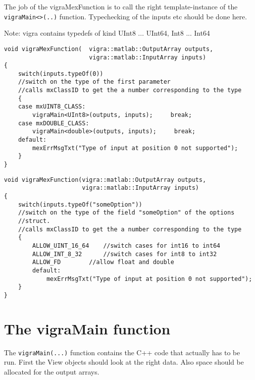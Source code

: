 \documentclass[a4paper,10pt]{article}
\begin{document}
The job of the vigraMexFunction is to call the right template-instance of the \verb+vigraMain<>(..)+ function. 
Typechecking of the inputs etc should be done here.


	
	Note: vigra contains typedefs of kind UInt8 ... UInt64, Int8 ... Int64
\begin{lstlisting}[caption={The first parameter of the Function can be of type double or of type UInt8  }]
void vigraMexFunction(	vigra::matlab::OutputArray outputs, 
                        vigra::matlab::InputArray inputs)
{
	switch(inputs.typeOf(0)) 
	//switch on the type of the first parameter
	//calls mxClassID to get the a number corresponding to the type
	{
	case mxUINT8_CLASS:
		vigraMain<UInt8>(outputs, inputs);     break;
	case mxDOUBLE_CLASS:
		vigraMain<double>(outputs, inputs);     break;
	default:
		mexErrMsgTxt("Type of input at position 0 not supported");
	}
}
\end{lstlisting}
\begin{lstlisting}[caption={Using Macros - This only works if vigraMain takes only one template parameter.}]
void vigraMexFunction(vigra::matlab::OutputArray outputs, 
                      vigra::matlab::InputArray inputs)
{
	switch(inputs.typeOf("someOption")) 
	//switch on the type of the field "someOption" of the options 
	//struct.
	//calls mxClassID to get the a number corresponding to the type
	{
		ALLOW_UINT_16_64	//switch cases for int16 to int64
		ALLOW_INT_8_32		//switch cases for int8 to int32
		ALLOW_FD		//allow float and double
		default:
			mexErrMsgTxt("Type of input at position 0 not supported");
	}
}
\end{lstlisting}

\section{The vigraMain function}
The \verb+vigraMain(...)+ function contains the C++ code that actually has to be 
run. First the View objects should look at the right data. Also space should 
be allocated for the output arrays.
\end{document}
